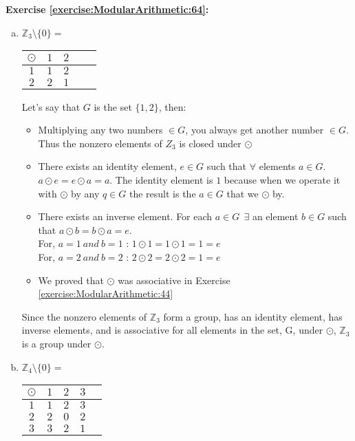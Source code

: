 \noindent\textbf{Exercise \ref{exercise:ModularArithmetic:64}:} %
\begin{enumerate}[(a)]
\item
\begin{center}
$\mathbb{Z}_{3} \setminus \{0\}=\ $
\begin{tabular}{c|c c c c}
$\odot$ & $1$ & $2$ \\
\hline
$1$ & $1$ & $2$	\\
$2$ & $2$ & $1$	\\
\end{tabular}
\end{center}
Let's say that $G$ is the set $\{1,2\}$, then:
\begin{itemize}
\item 
Multiplying any two numbers $\in G$, you always get another number $\in G$. Thus the nonzero elements of $Z_3$ is closed under $\odot$ 
            
\item 
There exists an identity element, $e\in G$ such that  $\forall$ elements $a\in G$. $a\odot e =e\odot a= a$. The identity element is $1$ because when we operate it with $\odot$ by any $q\in G$ the result is the $a\in G$ that we $\odot$ by.

\item 
There exists an inverse element. For each $a\in G~~\exists$ an element $b\in G$ such that $a\odot b=b\odot a=e$. \\
For, $a=1~and~b=1$ : $1\odot 1 =1\odot 1=1=e$\\
For, $a=2~and~b=2$ : $2\odot 2=2\odot 2=1= e$
            
\item 
We proved that $\odot$ was associative in Exercise \ref{exercise:ModularArithmetic:44}
\end{itemize}    
       
Since the nonzero elements of $\mathbb Z_{3}$ form a group, has an identity element, has inverse elements, and is associative for all elements in the set, G, under $\odot$, $\mathbb Z_{3}$ is a group under $\odot$. 

\item
\begin{center}
$\mathbb{Z}_{4} \setminus \{0\}=\ $
\begin{tabular}{c|c c c c}
$\odot$ & $1$ & $2$ & $3$\\
\hline
$1$ & $1$ & $2$ & $3$	\\
$2$ & $2$ & $0$ &	 $2$\\
$3$ & $3$ & $2$ & $1$\\
\end{tabular}
\end{center}
        

\end{enumerate}
